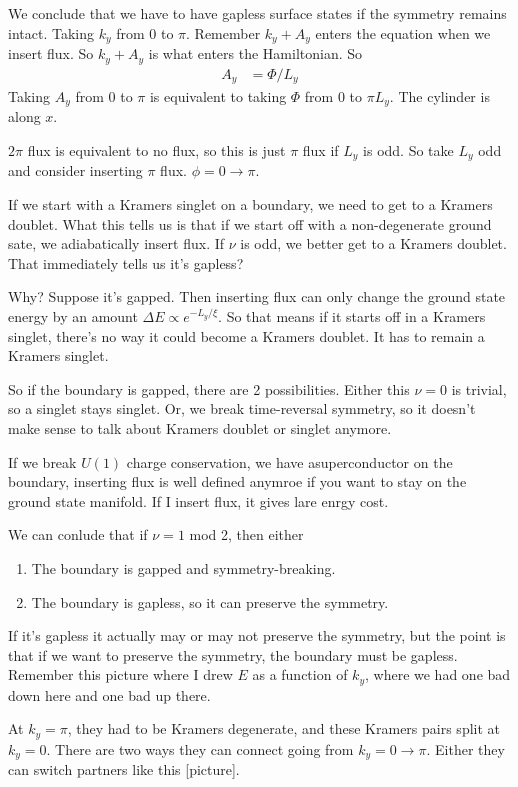 We conclude that we have to have gapless surface states if the symmetry remains
intact.
Taking $k_y$ from 0 to $\pi$.
Remember $k_y + A_y$ enters the equation when we insert flux.
So $k_y + A_y$ is what enters the Hamiltonian.
So
\begin{align}
    A_y &= \Phi/L_y
\end{align}
Taking $A_y$ from $0$ to $\pi$ is equivalent to taking
$\Phi$ from $0$ to $\pi L_y$.
The cylinder is along $x$.

$2\pi$ flux is equivalent to no flux,
so this is just $\pi$ flux if $L_y$ is odd.
So take $L_y$ odd and consider inserting $\pi$ flux.
$\phi=0\to \pi$.

If we start with a Kramers singlet on a boundary,
we need to get to a Kramers doublet.
What this tells us is that if we start off with a non-degenerate ground sate,
we adiabatically insert flux.
If $\nu$ is odd,
we better get to a Kramers doublet.
That immediately tells us it's gapless?

Why?
Suppose it's gapped.
Then inserting flux can only change the ground state energy by an amount
$\Delta E \propto e^{-L_y/\xi}$.
So that means if it starts off in a Kramers singlet,
there's no way it could become a Kramers doublet.
It has to remain a Kramers singlet.

So if the boundary is gapped,
there are 2 possibilities.
Either this $\nu=0$ is trivial,
so a singlet stays singlet.
Or, we break time-reversal symmetry,
so it doesn't make sense to talk about Kramers doublet or singlet anymore.

If we break $U(1)$ charge conservation,
we have asuperconductor on the boundary,
inserting flux is well defined anymroe if you want to stay on the ground state
manifold.
If I insert flux, it gives lare enrgy cost.

We can conlude that if $\nu=1$ mod 2,
then either
\begin{enumerate}
    \item The boundary is gapped and symmetry-breaking.
    \item The boundary is gapless, so it can preserve the symmetry.
\end{enumerate}
If it's gapless it actually may or may not preserve the symmetry,
but the point is that if we want to preserve the symmetry,
the boundary must be gapless.
Remember this picture where I drew $E$ as a function of $k_y$,
where we had one bad down here and one bad up there.

At $k_y=\pi$,
they had to be Kramers degenerate,
and these Kramers pairs split at $k_y=0$.
There are two ways they can connect going from $k_y=0\to \pi$.
Either they can switch partners like this [picture].

